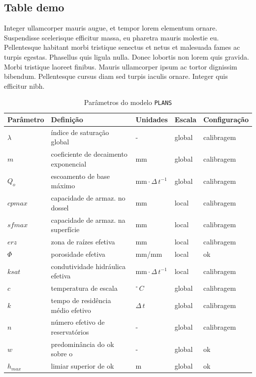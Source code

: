 \documentclass[./main.tex]{subfiles}
\begin{document}
\subsection{Table demo} \label{sec:intro:5}

\par Integer ullamcorper mauris augue, et tempor lorem elementum ornare. Suspendisse scelerisque efficitur massa, eu pharetra mauris molestie eu. Pellentesque habitant morbi tristique senectus et netus et malesuada fames ac turpis egestas. Phasellus quis ligula nulla. Donec lobortis non lorem quis gravida. Morbi tristique laoreet finibus. Mauris ullamcorper ipsum ac tortor dignissim bibendum. Pellentesque cursus diam sed turpis iaculis ornare. Integer quis efficitur nibh.

\begin{table}[t] 
		\centering	
		\small
		\begin{tabular}{ l  l  l  l  l} %
			\hline
			\textbf{Parâmetro} & \textbf{Definição} & \textbf{Unidades} & \textbf{Escala} & \textbf{Configuração}\\  
			\hline
			$\lambda$ & índice de saturação global & - & global & calibragem\\
			$m$ & coeficiente de decaimento exponencial & mm & global & calibragem\\
			$Q_o$ & escoamento de base máximo & $\text{mm}\cdot\Delta\,t^{-1}$ & global & calibragem\\
			$cpmax$ & capacidade de armaz. no dossel & mm & local & calibragem\\
			$sfmax$ & capacidade de armaz. na superfície & mm & local & calibragem\\
			$erz$ & zona de raízes efetiva & mm & local & calibragem\\
			$\Phi$ & porosidade efetiva & mm/mm & local & ok\\
			$ksat$ & condutividade hidráulica efetiva & $\text{mm}\cdot\Delta\,t^{-1}$ & local & calibragem \\
			$c$ & temperatura de escala & $^{\circ}\,C$ & global & calibragem\\
			$k$ & tempo de residência médio efetivo & $\Delta\,t$ & global & calibragem\\
			$n$ & número efetivo de reservatórios & - & global & calibragem\\
			$w$ & predominância do ok sobre o & - & global & ok \\
			$h_{max}$ & limiar superior de ok & m & global & ok \\
			\hline
		\end{tabular}
		\caption{Parâmetros do modelo \texttt{PLANS}}
		\label{tbl:params}
	\end{table} 
\end{document}
